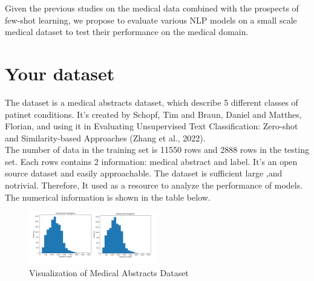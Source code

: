 \documentclass[11pt,a4paper]{article}
\begin{document}
\noindent Given the previous studies on the medical data combined with the prospects of few-shot learning, we propose to evaluate various NLP models on a small scale medical dataset to test their performance on the medical domain.



\section{Your dataset}
The dataset is a medical abstracts dataset, which
describe 5 different classes of patinet conditions.
It’s created by Schopf, Tim and Braun, Daniel
and Matthes, Florian, and using it in Evaluating
Unsupervised Text Classification: Zero-shot and
Similarity-based Approaches (Zhang et al., 2022).\\

\noindent The number of data in the training set is 11550
rows and 2888 rows in the testing set. Each rows
contains 2 information: medical abstract and label.
It’s an open source dataset and easily approachable. The dataset is sufficient large ,and
notrivial. Therefore, It used as a resource to analyze the performance of models. The numerical information is shown in the table below.\\
\begin{table}[ht]
\end{table}


\begin{figure}[h]
    \centering
    \includegraphics[width=0.5\textwidth]{Data_set_an.png}
    \caption{Visualization of Medical Abstracts Dataset}
    \label{fig:example}
\end{figure}
\end{document}
